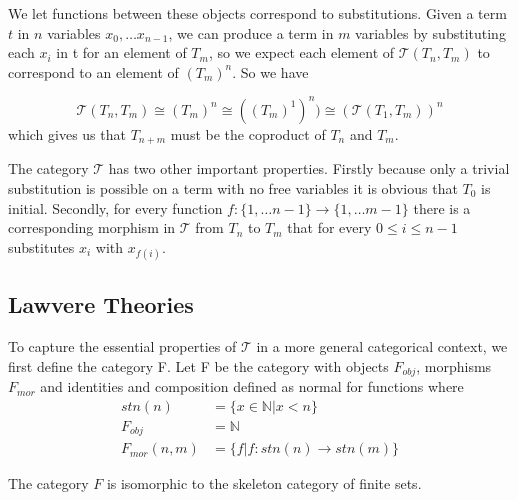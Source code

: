 We let functions between these objects correspond to substitutions. Given a term
$t$ in $n$ variables $x_0,\ldots x_{n-1}$, we can produce a term in $m$
variables by substituting each $x_i$ in t for an element of $T_m$, so we expect
each element of $\mathcal{T}(T_n, T_m)$ to correspond to an element of
$(T_m)^n$. So we have

\[
\mathcal{T}(T_n, T_m)\cong
(T_m)^n\cong
((T_m)^1)^n)\cong
(\mathcal{T}(T_1, T_m))^n
\]
which gives us that $T_{n+m}$ must be the coproduct of $T_n$ and
$T_m$.

The category $\mathcal{T}$ has two other important properties. Firstly because
only a trivial substitution is possible on a term with no free variables it is
obvious that $T_0$ is initial. Secondly, for every function $f: \{1,\ldots n-1\}
\rightarrow \{1,\ldots m-1\}$ there is a corresponding morphism in $\mathcal{T}$
from $T_n$ to $T_m$ that for every $0\leq i\leq n-1$ substitutes $x_i$ with
$x_{f(i)}$.

\subsection{Lawvere Theories}
To capture the essential properties of $\mathcal{T}$ in a more general
categorical context, we first define the category F. Let F be the category with
objects $F_{obj}$, morphisms $F_{mor}$ and identities and composition defined as
normal for functions where
\begin{align*}
    stn(n) &= \{x\in \mathbb{N} | x < n\} \\
    F_{obj} &= \mathbb{N} \\
    F_{mor}(n, m) &= \{f | f: stn(n)\to stn(m)\}
\end{align*}

The category $F$ is isomorphic to the skeleton category of finite sets.

